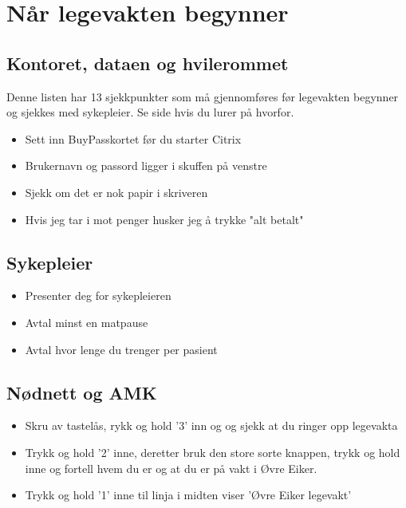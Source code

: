 \newpage
\chapter{Når legevakten begynner}\label{chap:lv_start}
	\section{Kontoret, dataen og hvilerommet}\label{sec:start_kontor}
	Denne listen har 13 sjekkpunkter som må gjennomføres før legevakten begynner og sjekkes med sykepleier. Se side \pageref{chap:desc_lv_start} hvis du lurer på hvorfor. \\
		\begin{itemize}
					\item Sett inn BuyPasskortet før du starter Citrix
					\item Brukernavn og passord ligger i skuffen på venstre  
			\item Sjekk om det er nok papir i skriveren
			\item Hvis jeg tar i mot penger husker jeg å trykke "alt betalt"
		\end{itemize}
	\section{Sykepleier}\label{sec:start_sykepleier}
		\begin{itemize}
			\item Presenter deg for sykepleieren
			\item Avtal minst en matpause
			\item Avtal hvor lenge du trenger per pasient
		\end{itemize}
	\section{Nødnett og AMK}\label{sec:start_AMK}
		\begin{itemize}
			\item Skru av tastelås, rykk og hold '3' inn og og sjekk at du ringer opp legevakta
			\item Trykk og hold '2' inne, deretter bruk den store sorte knappen, trykk og hold inne og fortell hvem du er og at du er på vakt i Øvre Eiker.
			\item Trykk og hold '1' inne til linja i midten viser 'Øvre Eiker legevakt'
		\end{itemize}
